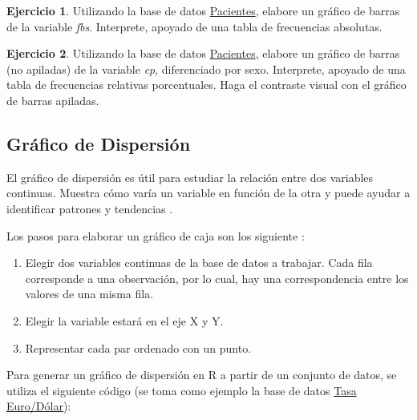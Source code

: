 \documentclass[
  11pt,
]{book}
\providecommand{\tightlist}{%
  \setlength{\itemsep}{0pt}\setlength{\parskip}{0pt}}
\theoremstyle{definition}
\theoremstyle{definition}
\theoremstyle{definition}
\newtheorem{exercise}{Ejercicio}[chapter]
\theoremstyle{definition}
\theoremstyle{remark}
\begin{document}
\begin{exercise}
Utilizando la base de datos \hyperref[Pacientes]{Pacientes}, elabore un gráfico de barras de la variable \emph{fbs}. Interprete, apoyado de una tabla de frecuencias absolutas.
\end{exercise}

\begin{exercise}
Utilizando la base de datos \hyperref[Pacientes]{Pacientes}, elabore un gráfico de barras (no apiladas) de la variable \emph{cp}, diferenciado por sexo. Interprete, apoyado de una tabla de frecuencias relativas porcentuales. Haga el contraste visual con el gráfico de barras apiladas.
\end{exercise}

\subsection{Gráfico de Dispersión}\label{gruxe1fico-de-dispersiuxf3n}

El gráfico de dispersión es útil para estudiar la relación entre dos variables continuas. Muestra cómo varía un variable en función de la otra y puede ayudar a identificar patrones y tendencias \citep{rowlingson2016data}.

Los pasos para elaborar un gráfico de caja son los siguiente \citep{healy2019data}:

\begin{enumerate}
\def\labelenumi{\arabic{enumi}.}
\tightlist
\item
  Elegir dos variables continuas de la base de datos a trabajar. Cada fila corresponde a una observación, por lo cual, hay una correspondencia entre los valores de una misma fila.
\item
  Elegir la variable estará en el eje X y Y.
\item
  Representar cada par ordenado con un punto.
\end{enumerate}

Para generar un gráfico de dispersión en R a partir de un conjunto de datos, se utiliza el siguiente código (se toma como ejemplo la base de datos \hyperref[TasaEURUSD]{Tasa Euro/Dólar}):
\end{document}
